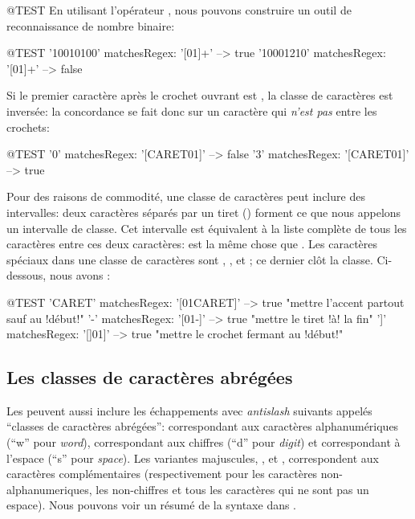 \documentclass[a4paper,10pt,twoside]{book}
\begin{document}
\begin{code}{@TEST}
En utilisant l'opérateur \ct{+}, nous pouvons construire un outil de
reconnaissance de nombre binaire:
\begin{code}{@TEST}
'10010100' matchesRegex: '[01]+' --> true
'10001210' matchesRegex: '[01]+' --> false
\end{code}

Si le premier caractère après le crochet ouvrant est ,
la classe de caractères est inversée: la concordance se fait donc sur
un caractère qui \emph{n'est pas} entre les crochets:
\begin{code}{@TEST}
'0' matchesRegex: '[CARET01]' --> false
'3' matchesRegex: '[CARET01]' --> true
\end{code}

Pour des raisons de commodité, une classe de caractères peut inclure
des intervalles: deux caractères séparés par un tiret (\ct{-})
forment ce que nous appelons un intervalle de classe.
Cet intervalle est équivalent à la liste complète de tous les
caractères entre ces deux caractères:   est la même chose
que  .
Les caractères spéciaux dans une classe de caractères sont 
, \ct{-}, et \ct{]}; ce dernier clôt la classe. 
Ci-dessous, nous avons :
\begin{code}{@TEST}
'CARET' matchesRegex: '[01CARET]'   --> true    "mettre l'accent partout sauf au !début!"
'-' matchesRegex: '[01-]' --> true    "mettre le tiret !à! la fin"
']' matchesRegex: '[]01]'   --> true    "mettre le crochet fermant au !début!"
\end{code}

\noindent{} 

\subsection{Les classes de caractères abrégées}
Les \expregs{} peuvent aussi inclure les échappements avec
\emph{antislash} suivants appelés ``classes de caractères abrégées'':
\ct{\w} correspondant aux caractères alphanumériques (``w'' pour
\emph{word}), \ct{\d} correspondant aux chiffres (``d'' pour
\emph{digit}) et \ct{\s} correspondant à l'espace (``s'' pour
\emph{space}).
Les variantes majuscules, \ct{\W}, \ct{\D} et \ct{\S}, correspondent
aux caractères complémentaires (respectivement pour les caractères
non-alphanumeriques, les non-chiffres et tous les caractères qui ne
sont pas un espace).
Nous pouvons voir un résumé de la syntaxe \pkgregex dans
.


\end{code}
\end{document}
